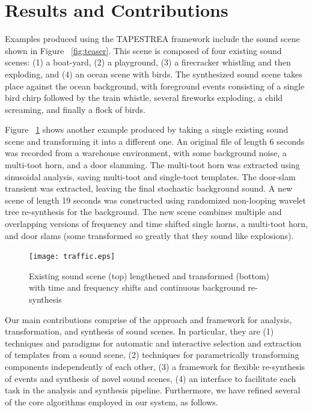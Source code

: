 \documentclass[review]{acmsiggraph}      %
\begin{document}
\section{Results and Contributions}




Examples produced using the TAPESTREA framework include the sound scene shown in Figure 
~\ref{fig:teaser}. This scene is 
composed of four existing sound scenes: (1) a boat-yard, (2) 
a playground, (3) a firecracker whistling and then exploding, and (4) an ocean scene with 
birds. The synthesized sound scene takes place against the ocean background, with foreground 
events consisting of a single bird chirp followed by the train whistle, several fireworks 
exploding, a child screaming, and finally a flock of birds. 

Figure ~\ref{fig:traffic} shows another example produced by taking a single 
existing sound scene and transforming it into a different one. 
An original file of length 6 seconds was recorded from a warehouse
environment, with some background noise, a multi-toot horn,
and a door slamming.  The multi-toot horn
was extracted using sinusoidal analysis,
saving multi-toot and single-toot templates.  The
door-slam transient was extracted, leaving
the final stochastic background sound.  A new
scene of length 19 seconds was constructed
using randomized non-looping wavelet
tree re-synthesis for the background.  The
new scene combines multiple and overlapping versions
of frequency and time shifted single horns,
a multi-toot horn, and door slams (some transformed
so greatly that they sound like explosions). 

\begin{figure}[h]
\centering
\texttt{[image: traffic.eps]}
\caption{Existing sound scene (top) lengthened and transformed (bottom) with time and frequency 
shifts and continuous background re-synthesis}
\label{fig:traffic}
\end{figure}

Our main contributions comprise of the approach and framework for analysis, transformation, 
and synthesis of sound scenes.  In particular, they are (1) techniques and paradigms for 
automatic and interactive selection and extraction of templates from a sound scene, (2) 
techniques for parametrically transforming components independently of each other, (3) a 
framework for flexible re-synthesis of events and synthesis of novel sound scenes, (4) an 
interface to facilitate each task in the analysis and synthesis pipeline.  Furthermore, we 
have refined several of the core algorithms employed in our system, as follows.
\end{document}

